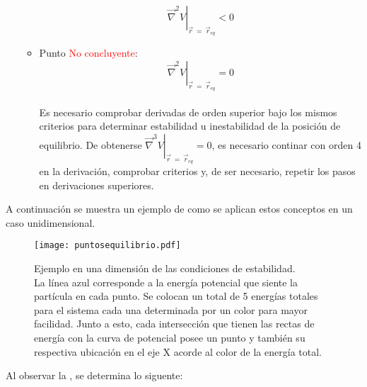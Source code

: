 \documentclass[/home/hernan/Documentos/Apuntes_mecanica_teorica/main.tex]{subfiles}
\begin{document}
\begin{definition}
\begin{itemize}
\begin{itemize}
				\begin{equation}
					\left .  \vec{\nabla }^{2}V \right|_{\vec{r} \: = \: \vec{r}_{eq}} < 0
					\label{eq: puntoinestable}
				\end{equation}
				\item Punto \textcolor{red}{No concluyente}:  				
				\begin{equation}
					\left .  \vec{\nabla }^{2}V \right|_{\vec{r} \: = \: \vec{r}_{eq}} = 0
					\label{eq: puntonoconcluyente}
				\end{equation}
				\\Es necesario comprobar derivadas de orden superior bajo los mismos criterios para determinar estabilidad u inestabilidad de la posición de equilibrio. De obtenerse  $\left .  \vec{\nabla }^{3}V \right|_{\vec{r} \: = \: \vec{r}_{eq}} = 0$, es necesario continar con orden 4 en la derivación, comprobar criterios y, de ser necesario, repetir los pasos en derivaciones superiores.
			\end{itemize}
		\end{itemize}
	\end{definition}

	A continuación se muestra un ejemplo de como se aplican estos conceptos en un caso unidimensional.
	\begin{figure}[H]
		\centering
		\texttt{[image: puntosequilibrio.pdf]}
		\caption{Ejemplo en una dimensión de las condiciones de estabilidad. \\ La línea azul corresponde a la energía potencial que siente la partícula en cada punto. Se colocan un total de 5 energías totales para el sistema cada una determinada por un color para mayor facilidad. Junto a esto, cada intersección que tienen las rectas de energía con la curva de potencial posee un punto y también su respectiva ubicación en el eje X acorde al color de la energía total.}
		\label{fig: puntosequilibrio}
	\end{figure}

	Al observar la , se determina lo siguente:
\end{document}
